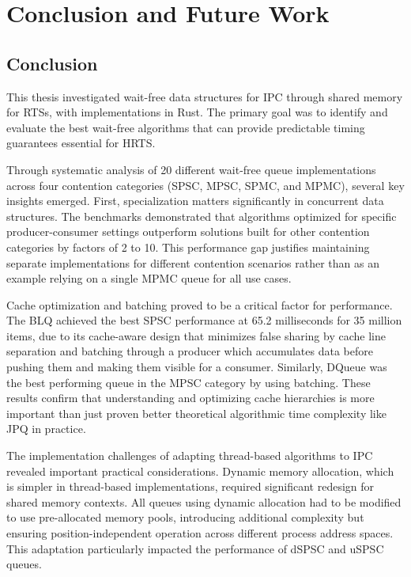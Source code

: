 \chapter{Conclusion and Future Work}\label{ch:conclusion}

\section{Conclusion}

This thesis investigated wait-free data structures for \ac{IPC} through shared memory for \acsp{RTS}, with implementations in Rust. The primary goal was to identify and evaluate the best wait-free algorithms that can provide predictable timing guarantees essential for \ac{HRTS}.

Through systematic analysis of 20 different wait-free queue implementations across four contention categories (\ac{SPSC}, \ac{MPSC}, \ac{SPMC}, and \ac{MPMC}), several key insights emerged. First, specialization matters significantly in concurrent data structures. The benchmarks demonstrated that algorithms optimized for specific producer-consumer settings outperform solutions built for other contention categories by factors of 2 to 10. This performance gap justifies maintaining separate implementations for different contention scenarios rather than as an example relying on a single \ac{MPMC} queue for all use cases.

Cache optimization and batching proved to be a critical factor for performance. The \acf{BLQ} achieved the best \ac{SPSC} performance at 65.2 milliseconds for 35 million items, due to its cache-aware design that minimizes false sharing by cache line separation and batching through a producer which accumulates data before pushing them and making them visible for a consumer. Similarly, DQueue was the best performing queue in the \ac{MPSC} category by using batching. These results confirm that understanding and optimizing cache hierarchies is more important than just proven better theoretical algorithmic time complexity like \ac{JPQ} in practice.

The implementation challenges of adapting thread-based algorithms to \ac{IPC} revealed important practical considerations. Dynamic memory allocation, which is simpler in thread-based implementations, required significant redesign for shared memory contexts. All queues using dynamic allocation had to be modified to use pre-allocated memory pools, introducing additional complexity but ensuring position-independent operation across different process address spaces. This adaptation particularly impacted the performance of \ac{dSPSC} and \ac{uSPSC} queues.

